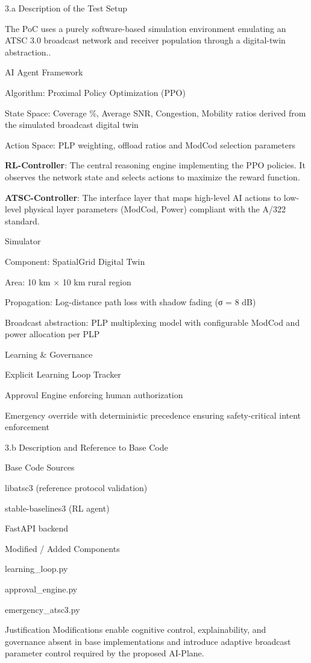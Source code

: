 \documentclass{article}
\begin{document}
3.a Description of the Test Setup

The PoC uses a purely software-based simulation environment emulating an ATSC 3.0 broadcast network and receiver population through a digital-twin abstraction..

AI Agent Framework

Algorithm: Proximal Policy Optimization (PPO)

State Space: Coverage \%, Average SNR, Congestion, Mobility ratios derived from the simulated broadcast digital twin

Action Space: PLP weighting, offload ratios and ModCod selection parameters

\textbf{RL-Controller}: The central reasoning engine implementing the PPO policies. It observes the network state and selects actions to maximize the reward function.

\textbf{ATSC-Controller}: The interface layer that maps high-level AI actions to low-level physical layer parameters (ModCod, Power) compliant with the A/322 standard.


Simulator

Component: SpatialGrid Digital Twin

Area: 10 km × 10 km rural region

Propagation: Log-distance path loss with shadow fading (σ = 8 dB)

Broadcast abstraction: PLP multiplexing model with configurable ModCod and power allocation per PLP

Learning \& Governance

Explicit Learning Loop Tracker

Approval Engine enforcing human authorization

Emergency override with deterministic precedence ensuring safety-critical intent enforcement

3.b Description and Reference to Base Code

Base Code Sources

libatsc3 (reference protocol validation)

stable-baselines3 (RL agent)

FastAPI backend

Modified / Added Components

learning\_loop.py

approval\_engine.py

emergency\_atsc3.py

Justification
Modifications enable cognitive control, explainability, and governance absent in base implementations and introduce adaptive broadcast parameter control required by the proposed AI-Plane.
\end{document}
